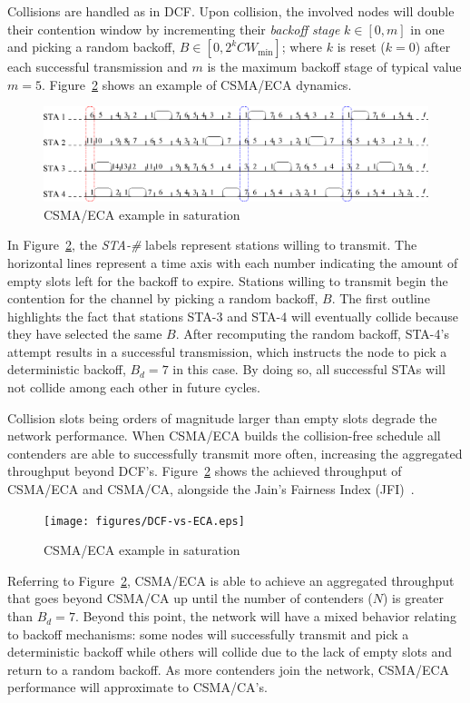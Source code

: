 \documentclass[a4paper,journal]{IEEEtran}
\begin{document}
Collisions are handled as in DCF. Upon collision, the involved nodes will double their contention window by incrementing their \emph{backoff stage} $k\in[0,m]$ in one and picking a random backoff, $B\in[0,2^{k}CW_{\min}]$; where $k$ is reset ($k=0$) after each successful transmission and $m$ is the maximum backoff stage of typical value $m=5$. Figure~\ref{fig:BECA} shows an example of CSMA/ECA dynamics.

\begin{figure}[tb]
\centering
  \includegraphics[width=0.8\linewidth]{figures/basicECA.eps}
  \caption{CSMA/ECA example in saturation}
  \label{fig:BECA}
\end{figure}

In Figure~\ref{fig:BECA}, the \emph{STA-\#} labels represent stations willing to transmit. The horizontal lines represent a time axis with each number indicating the amount of empty slots left for the backoff to expire. Stations willing to transmit begin the contention for the channel by picking a random backoff, $B$. The first outline highlights the fact that stations STA-3 and STA-4 will eventually collide because they have selected the same $B$. After recomputing the random backoff, STA-4's attempt results in a successful transmission, which instructs the node to pick a deterministic backoff, $B_{d}=7$ in this case. By doing so, all successful STAs will not collide among each other in future cycles.

Collision slots being orders of magnitude larger than empty slots degrade the network performance. When CSMA/ECA builds the collision-free schedule all contenders are able to successfully transmit more often, increasing the aggregated throughput beyond DCF's. Figure~\ref{fig:BECA} shows the achieved throughput of CSMA/ECA and CSMA/CA, alongside the Jain's Fairness Index (JFI)~\cite{JFI}.

\begin{figure}[tb]
\centering
  \texttt{[image: figures/DCF-vs-ECA.eps]}
  \caption{CSMA/ECA example in saturation}
  \label{fig:BECA}
\end{figure}

Referring to Figure~\ref{fig:BECA}, CSMA/ECA is able to achieve an aggregated throughput that goes beyond CSMA/CA up until the number of contenders ($N$) is greater than $B_{d}=7$. Beyond this point, the network will have a mixed behavior relating to backoff mechanisms: some nodes will successfully transmit and pick a deterministic backoff while others will collide due to the lack of empty slots and return to a random backoff. As more contenders join the network, CSMA/ECA performance will approximate to CSMA/CA's.
\end{document}
